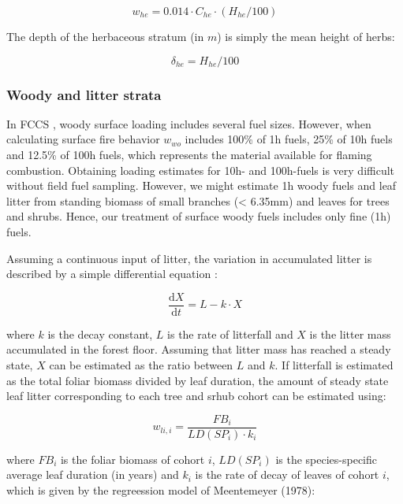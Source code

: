 \documentclass[]{book}
\begin{document}
\begin{equation}
w_{he} = 0.014 \cdot C_{he} \cdot (H_{he}/100)
\end{equation}

The depth of the herbaceous stratum (in \(m\)) is simply the mean height
of herbs:

\begin{equation}
\delta_{he} = H_{he}/100
\end{equation}

\subsubsection{Woody and litter strata}\label{woody-and-litter-strata}

In FCCS \citep{Prichard2013}, woody surface loading includes several
fuel sizes. However, when calculating surface fire behavior \(w_{wo}\)
includes 100\% of 1h fuels, 25\% of 10h fuels and 12.5\% of 100h fuels,
which represents the material available for flaming combustion.
Obtaining loading estimates for 10h- and 100h-fuels is very difficult
without field fuel sampling. However, we might estimate 1h woody fuels
and leaf litter from standing biomass of small branches (\textless{}
6.35mm) and leaves for trees and shrubs. Hence, our treatment of surface
woody fuels includes only fine (1h) fuels.

Assuming a continuous input of litter, the variation in accumulated
litter is described by a simple differential equation \citep{Birk1980}:

\begin{equation}
\frac{\mathrm{d}X}{\mathrm{d}t} = L - k\cdot X
\end{equation}

where \(k\) is the decay constant, \(L\) is the rate of litterfall and
\(X\) is the litter mass accumulated in the forest floor. Assuming that
litter mass has reached a steady state, \(X\) can be estimated as the
ratio between \(L\) and \(k\). If litterfall is estimated as the total
foliar biomass divided by leaf duration, the amount of steady state leaf
litter corresponding to each tree and srhub cohort can be estimated
using:

\begin{equation}
w_{li, i} = \frac{FB_i}{LD(SP_i) \cdot k_i}
\end{equation}

where \(FB_i\) is the foliar biomass of cohort \(i\), \(LD(SP_i)\) is
the species-specific average leaf duration (in years) and \(k_i\) is the
rate of decay of leaves of cohort \(i\), which is given by the
regreession model of Meentemeyer (1978):
\end{document}
